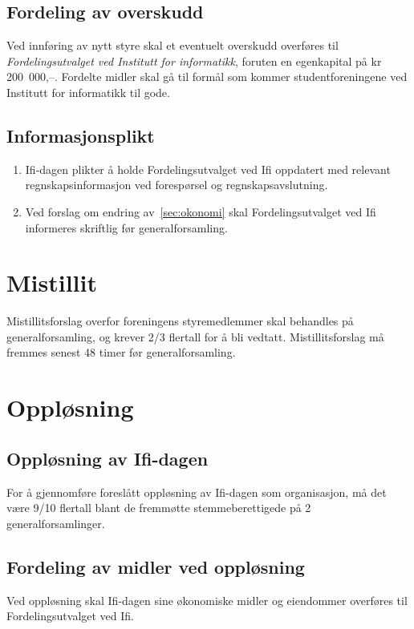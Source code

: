 \documentclass[norsk,a4paper]{article}
\begin{document}
\subsection{Fordeling av overskudd}
Ved innføring av nytt styre skal et eventuelt overskudd overføres til \textit{Fordelingsutvalget ved Institutt for informatikk}, foruten en egenkapital på kr 200~000,--. Fordelte midler skal gå til formål som kommer studentforeningene ved Institutt for informatikk til gode.
\subsection{Informasjonsplikt}
\begin{enumerate}
	\item{Ifi-dagen plikter å holde Fordelingsutvalget ved Ifi oppdatert med relevant regnskapsinformasjon ved forespørsel og regnskapsavslutning.}
	\item{Ved forslag om endring av~\ref{sec:okonomi} skal Fordelingsutvalget ved Ifi informeres skriftlig før generalforsamling.}
\end{enumerate}

\section{Mistillit}
Mistillitsforslag overfor foreningens styremedlemmer skal behandles på generalforsamling, og krever 2/3 flertall for å bli vedtatt. Mistillitsforslag må fremmes senest 48 timer før generalforsamling.

\section{Oppløsning}
\subsection{Oppløsning av Ifi-dagen}
For å gjennomføre foreslått oppløsning av Ifi-dagen som organisasjon, må det være 9/10 flertall
blant de fremmøtte stemmeberettigede på 2 generalforsamlinger.
\subsection{Fordeling av midler ved oppløsning}
Ved oppløsning skal Ifi-dagen sine økonomiske midler og eiendommer overføres til
Fordelingsutvalget ved Ifi.\label{ref:lastpage}%
\end{document}
